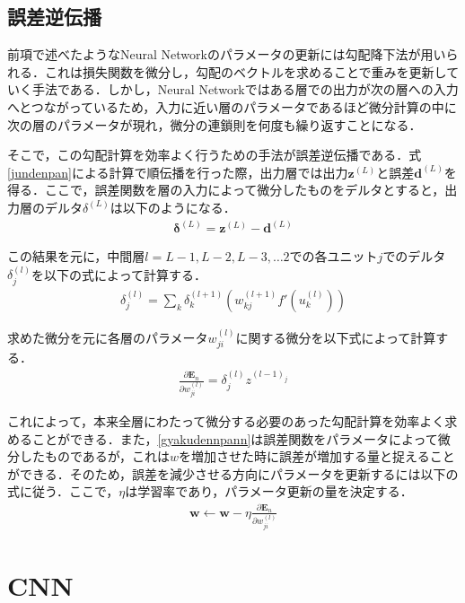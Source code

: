 \subsection{誤差逆伝播}
前項で述べたようなNeural Networkのパラメータの更新には勾配降下法が用いられる．これは損失関数を微分し，勾配のベクトルを求めることで重みを更新していく手法である．しかし，Neural Networkではある層での出力が次の層への入力へとつながっているため，入力に近い層のパラメータであるほど微分計算の中に次の層のパラメータが現れ，微分の連鎖則を何度も繰り返すことになる．

そこで，この勾配計算を効率よく行うための手法が誤差逆伝播である．式\ref{jundenpan}による計算で順伝播を行った際，出力層では出力$\bm{z}^{(L)}$と誤差$\bm{d}^{(L)}$を得る．ここで，誤差関数を層の入力によって微分したものをデルタとすると，出力層のデルタ$\delta^{(L)}$は以下のようになる．
\begin{align}
  \bm{\delta}^{(L)} = \bm{z}^{(L)} - \bm{d}^{(L)}
\end{align}

この結果を元に，中間層$l = L-1,L-2,L-3,\ldots 2$での各ユニット$j$でのデルタ$\delta^{(l)}_j$を以下の式によって計算する．
\begin{align}
  \delta^{(l)}_j = \sum_k \delta^{(l+1)}_k (w^{(l+1)}_{kj} f'(u^{(l)}_k))
\end{align}

求めた微分を元に各層のパラメータ$w^{(l)}_{ji}$に関する微分を以下式によって計算する．
\begin{align}
  \frac{\partial \bm{E}_n}{\partial w^{(l)}_{ji}} = \delta^{(l)}_j z^{(l-1)_j}
  \label{gyakudennpann}
\end{align}

これによって，本来全層にわたって微分する必要のあった勾配計算を効率よく求めることができる．また，\ref{gyakudennpann}は誤差関数をパラメータによって微分したものであるが，これは$w$を増加させた時に誤差が増加する量と捉えることができる．そのため，誤差を減少させる方向にパラメータを更新するには以下の式に従う．ここで，$\eta$は学習率であり，パラメータ更新の量を決定する．
\begin{align}
  \bm{w} \gets \bm{w} - \eta \frac{\partial \bm{E}_n}{\partial w^{(l)}_{ji}}
  \label{gyakudennpann}
\end{align}

\section{CNN}
